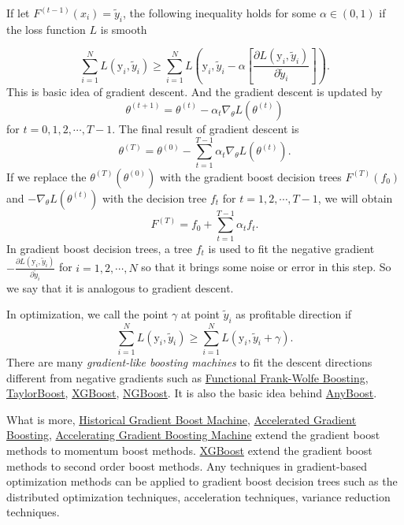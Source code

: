 \documentclass[UTF8]{article}
\begin{document}
If let $F^{(t-1)}(x_i)=\tilde{y}_i$, the following inequality holds for some $\alpha\in(0,1)$ if the loss function $L$ is smooth

$$\sum_{i=1}^{N} L(\mathrm{y}_i, \tilde{y}_i)\geq \sum_{i=1}^{N} L(\mathrm{y}_i, \tilde{y}_i-\alpha [\frac{\partial L(\mathrm{y}_i,\tilde{y}_i)}{\partial \tilde{y}_i}]).$$
This is basic idea of gradient descent.
And the gradient descent is updated by
$$\theta^{(t+1)}=\theta^{(t)}-\alpha_t\nabla_{\theta}L(\theta^{(t)})$$
for  $t=0,1,2,\cdots, T-1$.
The final result of gradient descent is
$$\theta^{(T)}=\theta^{(0)}-\sum_{t=1}^{T-1}\alpha_t\nabla_{\theta}L(\theta^{(t)}).$$
If we replace the $\theta^{(T)}(\theta^{(0)})$ with the gradient boost decision trees $F^{(T)}(f_0)$ 
and $-\nabla_{\theta}L(\theta^{(t)})$  with the decision tree $f_t$ for $t=1,2,\cdots,T-1$, 
we will obtain
$$F^{(T)}=f_0+\sum_{t=1}^{T-1}\alpha_t f_t.$$
In gradient boost decision trees, a tree $f_t$ is used to fit the negative gradient $-\frac{\partial L(\mathrm{y}_i,\tilde{y}_i)}{\partial \tilde{y}_i}$ for $i=1,2,\cdots, N$ so that it brings some noise or error in this step.
So we say that it is analogous to gradient descent.

In optimization, we call the point $\gamma$ at point $\tilde{y}_i$ as profitable direction if
$$\sum_{i=1}^{N} L(\mathrm{y}_i, \tilde{y}_i)\geq \sum_{i=1}^{N} L(\mathrm{y}_i, \tilde{y}_i+\gamma).$$
There are many \emph{gradient-like boosting machines} to fit the descent directions different from negative gradients
such as \href{https://arxiv.org/pdf/1510.02558.pdf}{Functional Frank-Wolfe Boosting},
\href{http://www.svcl.ucsd.edu/publications/conference/2011/TaylorBoost.pdf}{TaylorBoost},
\href{https://arxiv.org/abs/1603.02754}{XGBoost},
\href{https://arxiv.org/abs/1910.03225}{NGBoost}.
It is also the basic idea behind \href{https://papers.nips.cc/paper/1766-boosting-algorithms-as-gradient-descent.pdf}{AnyBoost}.

What is more,
\href{https://easychair.org/publications/open/pCtK}{Historical Gradient Boost Machine},
\href{https://arxiv.org/abs/1803.02042}{Accelerated Gradient Boosting},
\href{https://arxiv.org/abs/1903.08708}{Accelerating Gradient Boosting Machine} extend the gradient boost methods to momentum boost methods.
\href{https://arxiv.org/abs/1603.02754}{XGBoost} extend the gradient boost methods to second order boost methods.
Any techniques in gradient-based optimization methods can be applied to
gradient boost decision trees such as the distributed optimization techniques,
acceleration techniques, variance reduction techniques.
\end{document}
